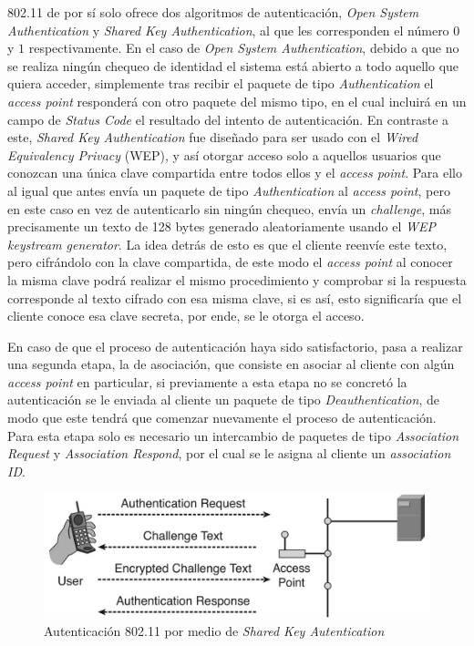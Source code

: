 \documentclass[10pt,a4paper]{article}
\begin{document}
802.11 de por sí solo ofrece dos algoritmos de autenticación, \textit{Open System Authentication} y \textit{Shared Key Authentication}, al que les corresponden el número $0$ y $1$ respectivamente. En el caso de \textit{Open System Authentication}, debido a que no se realiza ningún chequeo de identidad el sistema está abierto a todo aquello que quiera acceder, simplemente tras recibir el paquete de tipo \textit{Authentication} el \textit{access point} responderá con otro paquete del mismo tipo, en el cual incluirá en un campo de \textit{Status Code} el resultado del intento de autenticación. En contraste a este, \textit{Shared Key Authentication} fue diseñado para ser usado con el \textit{Wired Equivalency Privacy} (WEP), y así otorgar acceso solo a aquellos usuarios que conozcan una única clave compartida entre todos ellos y el \textit{access point}. Para ello al igual que antes envía un paquete de tipo \textit{Authentication} al \textit{access point}, pero en este caso en vez de autenticarlo sin ningún chequeo, envía un \textit{challenge}, más precisamente un texto de 128 bytes generado aleatoriamente usando el \textit{WEP keystream generator}. La idea detrás de esto es que el cliente reenvíe este texto, pero cifrándolo con la clave compartida, de este modo el \textit{access point} al conocer la misma clave podrá realizar el mismo procedimiento y comprobar si la respuesta corresponde al texto cifrado con esa misma clave, si es así, esto significaría que el cliente conoce esa clave secreta, por ende, se le otorga el acceso.

En caso de que el proceso de autenticación haya sido satisfactorio, pasa a realizar una segunda etapa, la de asociación, que consiste en asociar al cliente con algún \textit{access point} en particular, si previamente a esta etapa no se concretó la autenticación se le enviada al cliente un paquete de tipo \textit{Deauthentication}, de modo que este tendrá que comenzar nuevamente el proceso de autenticación. Para esta etapa solo es necesario un intercambio de paquetes de tipo \textit{Association Request} y \textit{Association Respond}, por el cual se le asigna al cliente un \textit{association ID}.

\begin{figure}[H]
\centerline{\includegraphics[scale=0.4]{images/80211_shared_key_authentication.jpg}}
\caption{Autenticación 802.11 por medio de \textit{Shared Key Autentication}}
\end{figure}
\end{document}
